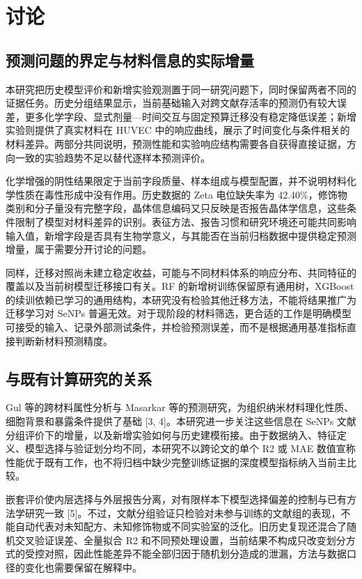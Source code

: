 \section{讨论}

\subsection{预测问题的界定与材料信息的实际增量}

本研究把历史模型评价和新增实验观测置于同一研究问题下，同时保留两者不同的证据任务。历史分组结果显示，当前基础输入对跨文献存活率的预测仍有较大误差，更多化学字段、显式剂量—时间交互与固定预算迁移没有稳定降低误差；新增实验则提供了真实材料在 HUVEC 中的响应曲线，展示了时间变化与条件相关的材料差异。两部分共同说明，预测性能和实验响应结构需要各自获得直接证据，方向一致的实验趋势不足以替代逐样本预测评价。

化学增强的阴性结果限定于当前字段质量、样本组成与模型配置，并不说明材料化学性质在毒性形成中没有作用。历史数据的 Zeta 电位缺失率为 42.40\%，修饰物类别和分子量没有完整字段，晶体信息编码又只反映是否报告晶体学信息，这些条件限制了模型对材料差异的识别。表征方法、报告习惯和研究环境还可能共同影响输入值，新增字段是否具有生物学意义，与其能否在当前归档数据中提供稳定预测增量，属于需要分开讨论的问题。

同样，迁移对照尚未建立稳定收益，可能与不同材料体系的响应分布、共同特征的覆盖以及当前树模型迁移接口有关。RF 的新增树训练保留原有通用树，XGBoost 的续训依赖已学习的通用结构，本研究没有检验其他迁移方法，不能将结果推广为迁移学习对 SeNPs 普遍无效。对于现阶段的材料筛选，更合适的工作是明确模型可接受的输入、记录外部测试条件，并检验预测误差，而不是根据通用基准指标直接判断新材料预测精度。

\subsection{与既有计算研究的关系}

Gul 等的跨材料属性分析与 Masarkar 等的预测研究，为组织纳米材料理化性质、细胞背景和暴露条件提供了基础 [3, 4]。本研究进一步关注这些信息在 SeNPs 文献分组评价下的增量，以及新增实验如何与历史建模衔接。由于数据纳入、特征定义、模型选择与验证划分均不同，本研究不以跨论文的单个 R2 或 MAE 数值宣称性能优于既有工作，也不将归档中缺少完整训练证据的深度模型指标纳入当前主比较。

嵌套评价使内层选择与外层报告分离，对有限样本下模型选择偏差的控制与已有方法学研究一致 [5]。不过，文献分组验证只检验对未参与训练的文献组的表现，不能自动代表对未知配方、未知修饰物或不同实验室的泛化。旧历史复现还混合了随机交叉验证误差、全量拟合 R2 和不同预处理设置，当前结果不构成只改变划分方式的受控对照，因此性能差异不能全部归因于随机划分造成的泄漏，方法与数据口径的变化也需要保留在解释中。

